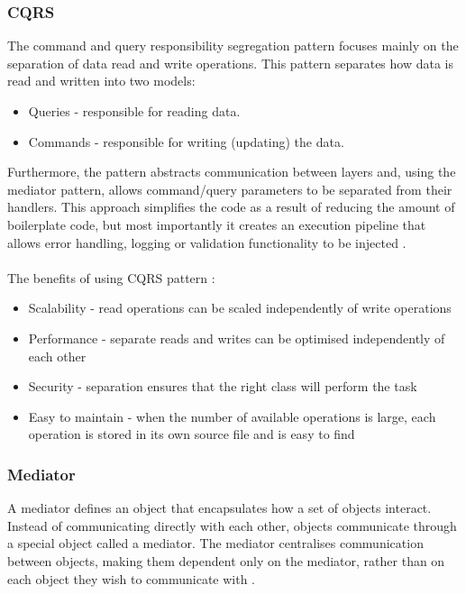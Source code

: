 \documentclass[a4paper,twoside,12pt]{book}
\begin{document}
\subsubsection{CQRS}
The command and query responsibility segregation pattern focuses mainly on the separation of data read and write operations. This pattern separates how data is read and written into two models:  
\begin{itemize}
\item Queries - responsible for reading data.
\item Commands - responsible for writing (updating) the data.
\end{itemize}

Furthermore, the pattern abstracts communication between layers and, using the mediator pattern, allows command/query parameters to be separated from their handlers. This approach simplifies the code as a result of reducing the amount of boilerplate code, but most importantly it creates an execution pipeline that allows error handling, logging or validation functionality to be injected \cite{bib:CQRS}. 
\paragraph{}
The benefits of using CQRS pattern
\cite{bib:CQRS}: 
\begin{itemize}
\item Scalability - read operations can be scaled independently of write operations
\item Performance - separate reads and writes can be optimised independently of each other
\item Security - separation ensures that the right class will perform the task
\item Easy to maintain - when the number of available operations is large, each operation is stored in its own source file and is easy to find
\end{itemize}

\subsubsection{Mediator}
A mediator defines an object that encapsulates how a set of objects interact. Instead of communicating directly with each other, objects communicate through a special object called a mediator. The mediator centralises communication between objects, making them dependent only on the mediator, rather than on each object they wish to communicate with \cite{bib:mediator}.
\end{document}
